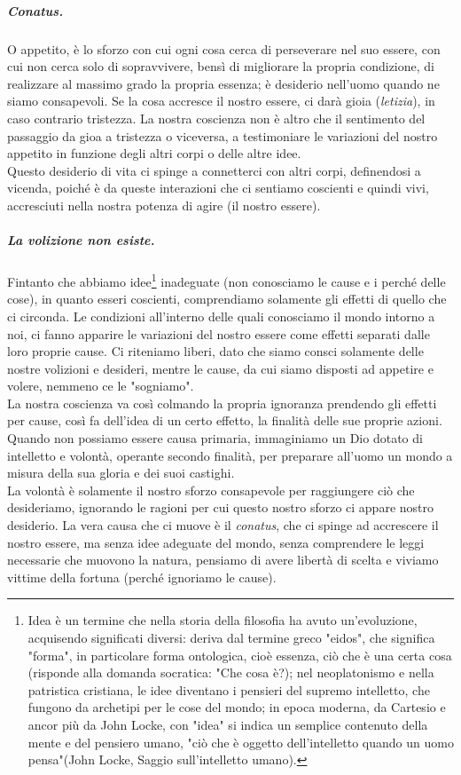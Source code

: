 \subparagraph{Conatus.} O appetito, è lo sforzo con cui ogni cosa cerca di perseverare nel suo essere, con cui non cerca solo di sopravvivere, bensì di migliorare la propria condizione, di realizzare al massimo grado la propria essenza; è desiderio nell'uomo quando ne siamo consapevoli. Se la cosa accresce il nostro essere, ci darà gioia (\textit{letizia}), in caso contrario tristezza. La nostra coscienza non è altro che il sentimento del passaggio da gioa a tristezza o viceversa, a testimoniare le variazioni del nostro appetito in funzione degli altri corpi o delle altre idee.\\
Questo desiderio di vita ci spinge a connetterci con altri corpi, definendosi a vicenda, poiché è da queste interazioni che ci sentiamo coscienti e quindi vivi, accresciuti nella nostra potenza di agire (il nostro essere).
\subparagraph{La volizione non esiste.} Fintanto che abbiamo idee\footnote{Idea è un termine che nella storia della filosofia ha avuto un'evoluzione, acquisendo significati diversi: deriva dal termine greco "eidos", che significa "forma", in particolare forma ontologica, cioè essenza, ciò che è una certa cosa (risponde alla domanda socratica: "Che cosa è?); nel neoplatonismo e nella patristica cristiana, le idee diventano i pensieri del supremo intelletto, che fungono da archetipi per le cose del mondo; in epoca moderna, da Cartesio e ancor più da John Locke, con "idea" si indica un semplice contenuto della mente e del pensiero umano, "ciò che è oggetto dell'intelletto quando un uomo pensa"(John Locke, Saggio sull'intelletto umano).} inadeguate (non conosciamo le cause e i perché delle cose), in quanto esseri coscienti, comprendiamo solamente gli effetti di quello che ci circonda. Le condizioni all'interno delle quali conosciamo il mondo intorno a noi, ci fanno apparire le variazioni del nostro essere come effetti separati dalle loro proprie cause. Ci riteniamo liberi, dato che siamo consci solamente delle nostre volizioni e desideri, mentre le cause, da cui siamo disposti ad appetire e volere, nemmeno ce le "sogniamo".\\
La nostra coscienza va così colmando la propria ignoranza prendendo gli effetti per cause, così fa dell'idea di un certo effetto, la finalità delle sue proprie azioni. Quando non possiamo essere causa primaria, immaginiamo un Dio dotato di intelletto e volontà, operante secondo finalità, per preparare all'uomo un mondo a misura della sua gloria e dei suoi castighi.\\
La volontà è solamente il nostro sforzo consapevole per raggiungere ciò che desideriamo, ignorando le ragioni per cui questo nostro sforzo ci appare nostro desiderio. La vera causa che ci muove è il \textit{conatus}, che ci spinge ad accrescere il nostro essere, ma senza idee adeguate del mondo, senza comprendere le leggi necessarie che muovono la natura, pensiamo di avere libertà di scelta e viviamo vittime della fortuna (perché ignoriamo le cause).
